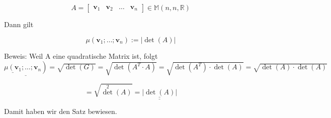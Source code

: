 \documentclass[10pt]{article}
\begin{document}
\[
A=\left[\begin{array}{llll}
\mathbf{v}_{1} & \mathbf{v}_{2} & \ldots & \mathbf{v}_{n} \tag{6.146}
\end{array}\right] \in \mathbb{M}(n, n, \mathbb{R})
\]

Dann gilt


\begin{equation*}
\mu\left(\mathbf{v}_{1} ; \ldots ; \mathbf{v}_{n}\right):=|\operatorname{det}(A)| \tag{6.147}
\end{equation*}


Beweis: Weil A eine quadratische Matrix ist, folgt\\
$\underline{\left.\underline{\mu\left(\mathbf{v}_{1}\right.} ; \ldots ; \mathbf{v}_{n}\right)}=\sqrt{\operatorname{det}(G)}=\sqrt{\operatorname{det}\left(A^{T} \cdot A\right)}=\sqrt{\operatorname{det}\left(A^{T}\right) \cdot \operatorname{det}(A)}=\sqrt{\operatorname{det}(A) \cdot \operatorname{det}(A)}$


\begin{equation*}
=\sqrt{\operatorname{det}^{2}(A)}=\underline{\underline{|\operatorname{det}(A)|}} \tag{6.148}
\end{equation*}


Damit haben wir den Satz bewiesen.
\end{document}
